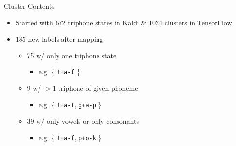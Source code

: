 \documentclass[final]{beamer} %
\begin{document}
\begin{frame}
\begin{columns}
\begin{column}{0.3\textwidth}
{\begin{block}{\boxnumber Cluster Contents}
          \begin{itemize}
          \item Started with 672 triphone states in Kaldi \& 1024 clusters in TensorFlow
          \item 185 new labels after mapping
            \begin{itemize}
            \item 75 w/ only one triphone state
              \begin{itemize}
              \item e.g. \{ \texttt{t+a-f} \}
              \end{itemize}
            \item 9 w/ $>1$ triphone of given phoneme
              \begin{itemize}
              \item e.g. \{ \texttt{t+a-f}, \texttt{g+a-p} \}
              \end{itemize}
            \item 39 w/ only vowels or only consonants
              \begin{itemize}
              \item e.g. \{ \texttt{t+a-f}, \texttt{p+o-k} \}
              \end{itemize}
            \end{itemize}
          \end{itemize}
        \end{block}

        \vfill
        
}
\end{column}
\end{columns}
\end{frame}
\end{document}
